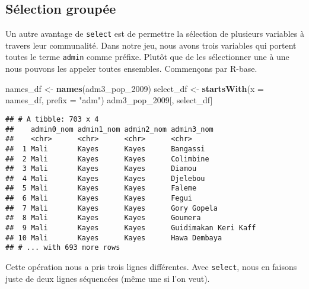\documentclass[]{book}
\newenvironment{Shaded}{\begin{snugshade}}{\end{snugshade}}
\newcommand{\KeywordTok}[1]{\textcolor[rgb]{0.13,0.29,0.53}{\textbf{#1}}}
\newcommand{\DataTypeTok}[1]{\textcolor[rgb]{0.13,0.29,0.53}{#1}}
\newcommand{\DecValTok}[1]{\textcolor[rgb]{0.00,0.00,0.81}{#1}}
\newcommand{\StringTok}[1]{\textcolor[rgb]{0.31,0.60,0.02}{#1}}
\newcommand{\OperatorTok}[1]{\textcolor[rgb]{0.81,0.36,0.00}{\textbf{#1}}}
\newcommand{\NormalTok}[1]{#1}
\begin{document}
\subsection{Sélection groupée}\label{selection-groupee}

Un autre avantage de \texttt{select} est de permettre la sélection de
plusieurs variables à travers leur communalité. Dans notre jeu, nous
avons trois variables qui portent toutes le terme \texttt{admin} comme
préfixe. Plutôt que de les sélectionner une à une nous pouvons les
appeler toutes ensembles. Commençons par R-base.

\begin{Shaded}
\begin{Highlighting}[]
\NormalTok{names_df <-}\StringTok{ }\KeywordTok{names}\NormalTok{(adm3_pop_}\DecValTok{2009}\NormalTok{)}
\NormalTok{select_df <-}\StringTok{ }\KeywordTok{startsWith}\NormalTok{(}\DataTypeTok{x =}\NormalTok{ names_df, }\DataTypeTok{prefix =} \StringTok{"adm"}\NormalTok{)}
\NormalTok{adm3_pop_}\DecValTok{2009}\NormalTok{[, select_df]}
\end{Highlighting}
\end{Shaded}

\begin{verbatim}
## # A tibble: 703 x 4
##    admin0_nom admin1_nom admin2_nom admin3_nom          
##    <chr>      <chr>      <chr>      <chr>               
##  1 Mali       Kayes      Kayes      Bangassi            
##  2 Mali       Kayes      Kayes      Colimbine           
##  3 Mali       Kayes      Kayes      Diamou              
##  4 Mali       Kayes      Kayes      Djelebou            
##  5 Mali       Kayes      Kayes      Faleme              
##  6 Mali       Kayes      Kayes      Fegui               
##  7 Mali       Kayes      Kayes      Gory Gopela         
##  8 Mali       Kayes      Kayes      Goumera             
##  9 Mali       Kayes      Kayes      Guidimakan Keri Kaff
## 10 Mali       Kayes      Kayes      Hawa Dembaya        
## # ... with 693 more rows
\end{verbatim}

Cette opération nous a pris trois lignes différentes. Avec
\texttt{select}, nous en faisons juste de deux lignes séquencées (même
une si l'on veut).

\begin{Shaded}
\end{Shaded}
\end{document}
